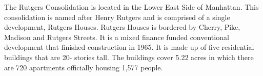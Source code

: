     

  

The Rutgers Consolidation is located in the Lower East Side of Manhattan. This consolidation is named after Henry Rutgers and is comprised of a single development, Rutgers Houses. Rutgers Houses is bordered by Cherry, Pike, Madison and Rutgers Streets. It is a mixed finance funded conventional development that finished construction in 1965. It is made up of five residential buildings that are 20- stories tall. The buildings cover 5.22 acres in which there are 720 apartments officially housing 1,577 people.